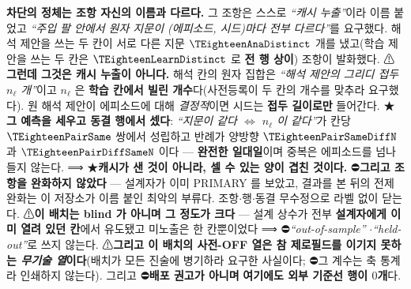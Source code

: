 \documentclass[11pt]{report}
\numberwithin{equation}{chapter}
\numberwithin{figure}{chapter}
\numberwithin{table}{chapter}
\begin{document}
\textbf{차단의 정체는 조항 자신의 이름과 다르다.} 그 조항은 스스로 \emph{``캐시 누출''}이라
이름 붙었고 \emph{``주입 팔 안에서 원자 지문이 (에피소드, 시드)마다 전부 다르다''}를
요구했다. 해석 제안을 쓰는 두 칸이 서로 다른 지문 $\TEighteenAnaDistinct$ 개를 냈고(학습
제안을 쓰는 두 칸은 $\TEighteenLearnDistinct$ 로 \textbf{전 행 상이}) 조항이 발화했다.
⚠\textbf{그런데 그것은 캐시 누출이 아니다.} 해석 칸의 원자 집합은 \emph{``해석 제안의
그리디 접두 $n_\ell$ 개''}이고 $n_\ell$ 은 \textbf{학습 칸에서 빌린 개수}다(사전등록이 두
칸의 개수를 맞추라 요구했다). 원 해석 제안이 에피소드에 대해 \emph{결정적}이면 시드는
\textbf{접두 길이로만} 들어간다. ★\textbf{그 예측을 세우고 동결 행에서 셌다}:
\emph{``지문이 같다 $\Leftrightarrow$ $n_\ell$ 이 같다''}가 칸당 $\TEighteenPairSame$
쌍에서 성립하고 반례가 양방향 $\TEighteenPairSameDiffN$ 과 $\TEighteenPairDiffSameN$ 이다
--- \textbf{완전한 일대일}이며 중복은 에피소드를 넘나들지 않는다. ⟹ ★\textbf{캐시가 샌
것이 아니라, 셀 수 있는 양이 겹친 것이다.}
⛔\textbf{그리고 조항을 완화하지 않았다} --- 설계자가 이미 PRIMARY 를 보았고, 결과를 본
뒤의 전제 완화는 이 저장소가 이름 붙인 최악의 부류다. 조항$\cdot$행$\cdot$동결 무수정으로
라벨 없이 닫는다.
⚠\textbf{이 배치는 blind 가 아니며 그 정도가 크다} --- 설계 상수가 전부 \textbf{설계자에게
이미 열려 있던 칸}에서 유도됐고 미노출은 한 칸뿐이었다 ⟹ ⛔\emph{``out-of-sample''}
$\cdot$\emph{``held-out''}로 쓰지 않는다. ⚠\textbf{그리고 이 배치의 사전-OFF 열은 참 제로필드를 이기지 못하는 \emph{무기술
열}이다}(배치가 모든 진술에 병기하라 요구한 사실이다; ⛔그 계수는 축 통계라 인쇄하지
않는다). 그리고 ⛔\textbf{배포 권고가 아니며} \textbf{여기에도 외부 기준선 행이 $0$개}다.
\end{document}
